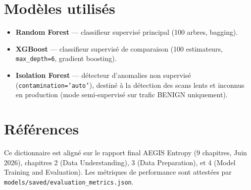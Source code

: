 \documentclass[12pt,a4paper]{article}
\begin{document}
\section{Mod\`{e}les utilis\'{e}s}

\begin{itemize}[nosep,leftmargin=1.5em]
  \item \textbf{Random Forest} --- classifieur supervis\'{e} principal (100 arbres, bagging).
  \item \textbf{XGBoost} --- classifieur supervis\'{e} de comparaison (100 estimateurs,
        \texttt{max\_depth=6}, gradient boosting).
  \item \textbf{Isolation Forest} --- d\'{e}tecteur d'anomalies non supervis\'{e}
        (\texttt{contamination='auto'}), destin\'{e} \`{a} la d\'{e}tection des scans
        lents et inconnus en production (mode semi-supervis\'{e} sur trafic BENIGN
        uniquement).
\end{itemize}

\section{R\'{e}f\'{e}rences}

Ce dictionnaire est align\'{e} sur le rapport final AEGIS Entropy (9 chapitres,
Juin 2026), chapitres 2 (Data Understanding), 3 (Data Preparation), et 4 (Model
Training and Evaluation). Les m\'{e}triques de performance sont attest\'{e}es par
\texttt{models/saved/evaluation\_metrics.json}.
\end{document}
